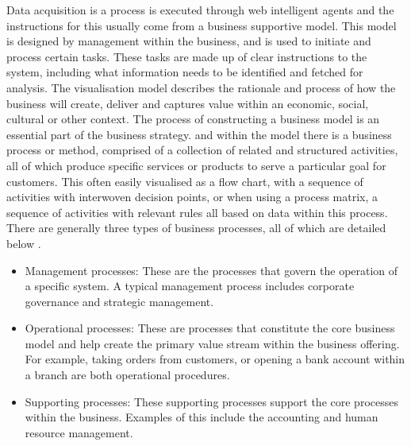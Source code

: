 Data acquisition is a process is executed through web intelligent agents and the instructions for this usually come from a business supportive model. This model is designed by management within the business, and is used to initiate and process certain tasks. These tasks are made up of clear instructions to the system, including what information needs to be identified and fetched for analysis. The visualisation model describes the rationale and process of how the business will create, deliver and captures value within an economic, social, cultural or other context. The process of constructing a business model is an essential part of the business strategy. and within the model there is a business process or method, comprised of a collection of related and structured activities, all of which produce specific services or products to serve a particular goal for customers. This often easily visualised as a flow chart, with a sequence of activities with interwoven decision points, or when using a process matrix, a sequence of activities with relevant rules all based on data within this process. There are generally three types of business processes, all of which are detailed below \cite{van2003business}.

\begin{itemize}
\item 	Management processes: These are the processes that govern the operation of a specific system. A typical management process includes corporate governance and strategic management.

\item	Operational processes: These are processes that constitute the core business model and help create the primary value stream within the business offering. For example, taking orders from customers, or opening a bank account within a branch are both operational procedures.

\item	Supporting processes: These supporting processes support the core processes within the business. Examples of this include the accounting and human resource management.
\end{itemize}

